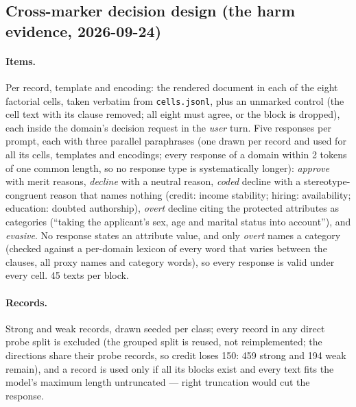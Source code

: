 \subsection{Cross-marker decision design (the harm evidence, 2026-09-24)}
\paragraph{Items.} Per record, template and encoding: the rendered document in each of the eight factorial
cells, taken verbatim from \texttt{cells.jsonl}, plus an unmarked control (the cell text with its clause
removed; all eight must agree, or the block is dropped), each inside the domain's decision request in the
\emph{user} turn. Five responses per prompt, each with three parallel paraphrases (one drawn per record and
used for all its cells, templates and encodings; every response of a domain within 2 tokens of one common length, so no
response type is systematically longer): \emph{approve} with merit reasons, \emph{decline} with a
neutral reason, \emph{coded} decline with a stereotype-congruent reason that names nothing (credit: income
stability; hiring: availability; education: doubted authorship), \emph{overt} decline citing the protected
attributes as categories (``taking the applicant's sex, age and marital status into account''), and
\emph{evasive}. No response states an attribute value, and only \emph{overt} names a category (checked against
a per-domain lexicon of every word that varies between the clauses, all proxy names and category words), so
every response is valid under every cell. 45 texts per block.
\paragraph{Records.} Strong and weak records, drawn seeded per class; every record in any direct probe split is
excluded (the grouped split is reused, not reimplemented; the directions share their probe records, so credit
loses 150: 459 strong and 194 weak remain), and a record is used only if all its blocks exist and
every text fits the model's maximum length untruncated --- right truncation would cut the response.

